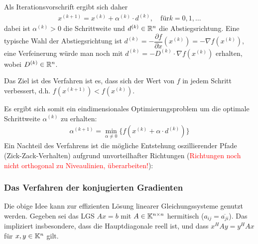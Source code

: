 Als Iterationsvorschrift ergibt sich daher 
%
\begin{align*}
  x^{(k+1)} 
  = x^{(k)}+\alpha^{(k)}\cdot d^{(k)}, 
  \quad \text{für} k=0,1,\dots
\end{align*}
%
dabei ist $\alpha^{(k)}>0$ die Schrittweite und $d^{(k)}\in\mathbb R^n$ die Abstiegsrichtung.
Eine typische Wahl der Abstiegsrichtung ist $d^{(k)}=-\dfrac{\partial f}{\partial x} (x^{(k)})=-\nabla f(x^{(k)})$, 
eine Verfeinerung würde man noch mit $d^{(k)}=-D^{(k)}\cdot\nabla f(x^{(k)})$ erhalten, wobei $D^{(k)}\in\mathbb R^n$.

Das Ziel ist des Verfahren ist es, dass sich der Wert von $f$ in jedem Schritt verbessert, 
d.h. $f(x^{(k+1)})<f(x^{(k)})$. 

Es ergibt sich somit ein eindimensionales Optimierungsproblem um die optimale Schrittweite $\alpha^{(k)}$ zu erhalten:
%
\begin{align*}
  \alpha^{(k+1)}
  =\min_{\alpha\neq 0}\{f(x^{(k)}+\alpha\cdot d^{(k)})\}
\end{align*}
%
Ein Nachteil des Verfahrens ist die mögliche Entstehung oszillierender Pfade (\glqq Zick-Zack-Verhalten\grqq{}) 
aufgrund unvorteilhafter Richtungen (\textcolor{red}{Richtungen noch nicht orthogonal zu Niveaulinien, überarbeiten!}):

\begin{center}
  
\end{center}

\subsubsection{Das Verfahren der konjugierten Gradienten}
Die obige Idee kann zur effizienten Lösung linearer Gleichungssysteme genutzt werden.
Gegeben sei das LGS $Ax=b$ mit $A\in\mathbb K^{n\times n}$ hermitisch
($a_{ij}=\overline{a_{ji}}$). Das impliziert insbesondere, dass die Hauptdiagonale reell ist, und dass $x^HAy = y^HAx$ 
für $x,y\in\mathbb K^n$ gilt.

